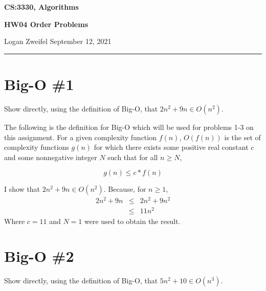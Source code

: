 \documentclass[11pt]{article}
\begin{document}
\thispagestyle{empty}

\begin{center}
\bf\large CS:3330, Algorithms
\end{center}

\begin{center}
\bf\large HW04 Order Problems    %
\end{center}

\noindent
Logan Zweifel     %
\hfill
September 12, 2021           %

\noindent
\rule{\textwidth}{1pt}

\medskip



\section{Big-O \#1}
Show directly, using the definition of Big-O, that $2n^2+9n \in O(n^2)$.


\bigskip
\bigskip
The following is the definition for Big-O which will be used for problems 1-3 on this assignment. For a given complexity function $f(n)$, $O(f(n))$ is the set of complexity functions $g(n)$ for which there exists some positive real constant $c$ and some nonnegative integer $N$ such that for all $n \geq N$,

\begin{equation*}
g(n) \leq c * f(n)
\end{equation*}

\bigskip
\bigskip

\noindent
I show that $2n^2+9n \in O(n^2)$. Because, for $n \geq 1$,
\begin{eqnarray*}
2n^2 + 9n &\leq& 2n^2 + 9n^2 \\
&\leq& 11n^2
\end{eqnarray*}
Where $c=11$ and $N=1$ were used to obtain the result.



\section{Big-O \#2}
Show directly, using the definition of Big-O, that $5n^2+10 \in O(n^3)$.

\bigskip
\bigskip
\end{document}
